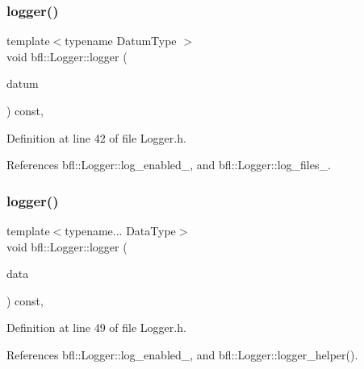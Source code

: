 \subsubsection{\texorpdfstring{logger()}{logger()}\hspace{0.1cm}{\footnotesize\ttfamily [3/4]}}
{\footnotesize\ttfamily template$<$typename Datum\+Type $>$ \\
void bfl\+::\+Logger\+::logger (\begin{DoxyParamCaption}\item[{Datum\+Type}]{datum }\end{DoxyParamCaption}) const\hspace{0.3cm}{\ttfamily [inline]}, {\ttfamily [inherited]}}



Definition at line 42 of file Logger.\+h.



References bfl\+::\+Logger\+::log\+\_\+enabled\+\_\+, and bfl\+::\+Logger\+::log\+\_\+files\+\_\+.

\mbox{\label{classbfl_1_1Logger_a0f0cf7ce956546d94dfb1feb7cebf171}} 
\subsubsection{\texorpdfstring{logger()}{logger()}\hspace{0.1cm}{\footnotesize\ttfamily [4/4]}}
{\footnotesize\ttfamily template$<$typename... Data\+Type$>$ \\
void bfl\+::\+Logger\+::logger (\begin{DoxyParamCaption}\item[{Data\+Type...}]{data }\end{DoxyParamCaption}) const\hspace{0.3cm}{\ttfamily [inline]}, {\ttfamily [inherited]}}



Definition at line 49 of file Logger.\+h.



References bfl\+::\+Logger\+::log\+\_\+enabled\+\_\+, and bfl\+::\+Logger\+::logger\+\_\+helper().

